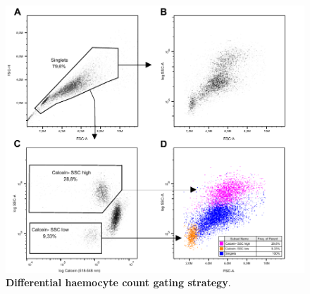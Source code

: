 \begin{figure}[H]
    \centering
    \includegraphics[width=1.0\textwidth]{figures/Gating strategy/GatestratGY SSC Calcein PNG.pdf}
    \caption{ \textbf{Differential haemocyte count gating strategy}.}
    \label{fig:DHC_gatestrat}
\end{figure}





